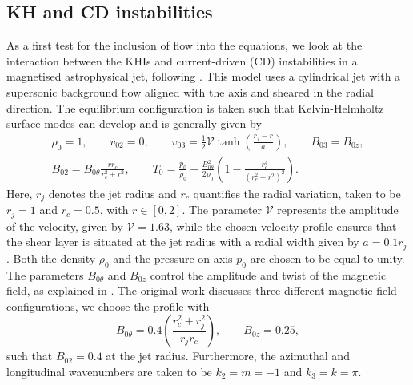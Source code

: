\subsection{KH and CD instabilities} \label{ss: kh_cd_instabilities}
As a first test for the inclusion of flow into the equations, we look at the interaction between the KHIs and current-driven (\gls{CD}) instabilities in a magnetised astrophysical jet, following \citet{baty2002}. This model uses a cylindrical jet with a supersonic background flow aligned with the axis and sheared in the radial direction. The equilibrium configuration is taken such that Kelvin-Helmholtz surface modes can develop and is generally given by
\begin{equation} \label{eq: kh_cd_equilibrium}
  \begin{gathered}
    \rho_0 = 1,
    \qquad
    v_{02} = 0,
    \qquad
    v_{03} = \frac{1}{2}\mathcal{V}\tanh\left(\frac{r_j - r}{a}\right),
    \qquad
    B_{03} = B_{0z}, \\
    B_{02} = B_{0\theta} \frac{r r_c}{r_c^2 + r^2},
    \qquad
    T_0 = \frac{p_0}{\rho_0} - \frac{B_{0\theta}^2}{2\rho_0}\left(1 - \frac{r_c^4}{\left(r_c^2 + r^2\right)^2}\right).
  \end{gathered}
\end{equation}
Here, $r_j$ denotes the jet radius and $r_c$ quantifies the radial variation, taken to be $r_j = 1$ and $r_c = 0.5$, with $r \in [0, 2]$. The parameter $\mathcal{V}$ represents the amplitude of the velocity, given by $\mathcal{V} = 1.63$, while the chosen velocity profile ensures that the shear layer is situated at the jet radius with a radial width given by $a = 0.1r_j$. Both the density $\rho_0$ and the pressure on-axis $p_0$ are chosen to be equal to unity. The parameters $B_{0\theta}$ and $B_{0z}$ control the amplitude and twist of the magnetic field, as explained in \citet{baty2002}. The original work discusses three different magnetic field configurations, we choose the profile with
\begin{equation}
  B_{0\theta} = 0.4\left(\frac{r_c^2 + r_j^2}{r_j r_c}\right),
  \qquad
  B_{0z} = 0.25,
\end{equation}
such that $B_{02} = 0.4$ at the jet radius. Furthermore, the azimuthal and longitudinal wavenumbers are taken to be $k_2 = m = -1$ and $k_3 = k = \pi$.

